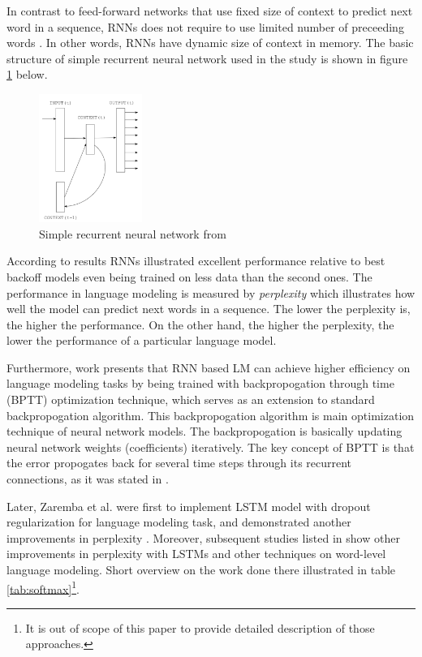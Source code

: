 \documentclass{IEEEtran}
\begin{document}
In contrast to feed-forward networks that use fixed size of context to predict next word in a sequence, RNNs does not require to use limited number of preceeding words \cite{Mikolov2010NeuralLM}. In other words, RNNs have dynamic size of context in memory. The basic structure of simple recurrent neural network used in the study is shown in figure \ref{fig:rnn} below.

\begin{figure}[h]
	\centering
	\includegraphics[width=0.3\textwidth]{rnn}
	\caption{Simple recurrent neural network from \cite{Mikolov2010NeuralLM}}
	\label{fig:rnn}
\end{figure}

According to \cite{Mikolov2010NeuralLM} results RNNs illustrated excellent performance relative to best backoff models even being trained on less data than the second ones. The performance in language modeling is measured by \textit{perplexity} which illustrates how well the model can predict next words in a sequence. The lower the perplexity is, the higher the performance. On the other hand, the higher the perplexity, the lower the performance of a particular language model.

Furthermore, \cite{Mikolov2011ExtensionsOR} work presents that RNN based LM can achieve higher efficiency on language modeling tasks by being trained with backpropogation through time (BPTT) optimization technique, which serves as an extension to standard backpropogation algorithm. This backpropogation algorithm is main optimization technique of neural network models. The backpropogation is basically updating neural network weights (coefficients) iteratively. The key concept of BPTT is that the error propogates back for several time steps through its recurrent connections, as it was stated in \cite{Mikolov2011ExtensionsOR}.

Later, Zaremba et al. were first to implement LSTM model with dropout regularization for language modeling task, and demonstrated another improvements in perplexity \cite{Zaremba2014LSTM}. Moreover, subsequent studies listed in \cite{Salakhutdinov2017Softmax} show other improvements in perplexity with LSTMs and other techniques on word-level language modeling. Short overview on the work done there illustrated in table \ref{tab:softmax}\footnote{It is out of scope of this paper to provide detailed description of those approaches.}.
\end{document}
